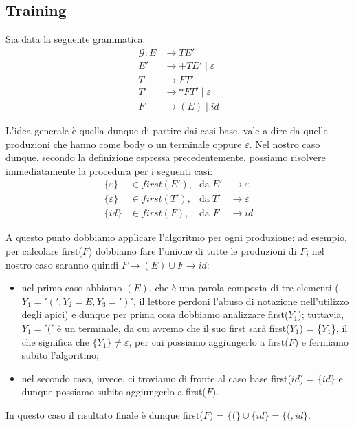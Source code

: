 \documentclass[class=book, crop=false, oneside, 12pt]{standalone}
\begin{document}
\subsection{Training}
Sia data la seguente grammatica:
\begin{align*}
    \mathcal{G}: E &\rightarrow TE' \\
    E' &\rightarrow +TE' \mid \varepsilon \\
    T &\rightarrow FT' \\
    T' &\rightarrow *FT' \mid \varepsilon\\
    F &\rightarrow (E) \mid id
\end{align*}

L'idea generale è quella dunque di partire dai casi base, vale a dire da quelle produzioni che hanno come body o un terminale oppure \(\varepsilon\). Nel nostro caso dunque, secondo la definizione espressa precedentemente, possiamo risolvere immediatamente la procedura per i seguenti casi: 
\begin{align*}
    \{\varepsilon\} &\in first(E')\textrm{,} &\textrm{da}\; E' &\to \varepsilon \\
    \{\varepsilon\} &\in first(T')\textrm{,} &\textrm{da}\; T' &\to \varepsilon \\
    \{id\} &\in first(F)\textrm{,} &\textrm{da } F\; &\to id
\end{align*}

A questo punto dobbiamo applicare l'algoritmo per ogni produzione: ad esempio, per calcolare first(\(F\)) dobbiamo fare l'unione di tutte le produzioni di \(F\); nel nostro caso saranno quindi \(F \rightarrow (E) \cup F \rightarrow id\):
\begin{itemize}
    \item nel primo caso abbiamo \((E)\), che è una parola composta di tre elementi (\(Y_1 = '(', Y_2 = E, Y_3 = ')'\), il lettore perdoni l'abuso di notazione nell'utilizzo degli apici) e dunque per prima cosa dobbiamo analizzare first(\(Y_1\)); tuttavia, \(Y_1 = '('\) è un terminale, da cui avremo che il suo first sarà first(\(Y_1\)) = \{\(Y_1\)\}, il che significa che \(\{Y_1\} \neq \varepsilon\), per cui possiamo aggiungerlo a first(\(F\)) e fermiamo subito l'algoritmo;
    \item nel secondo caso, invece, ci troviamo di fronte al caso base first(\(id\)) = \(\{id\}\) e dunque possiamo subito aggiungerlo a first(\(F\)).
\end{itemize}
In questo caso il risultato finale è dunque first(\(F\)) = \(\{(\} \cup \{id\} = \{(, id\}\).
\end{document}
